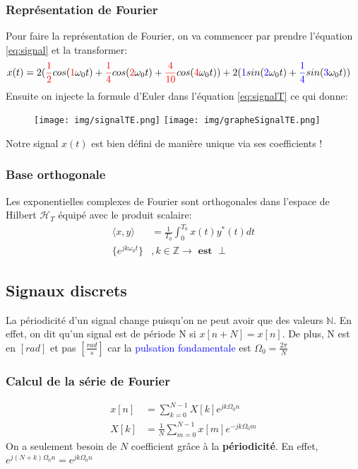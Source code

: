 \documentclass{report}
\begin{document}
\subsubsection{Représentation de Fourier} %
Pour faire la représentation de Fourier, on va commencer par prendre l'équation \ref{eq:signal} et la transformer:
\begin{align}
x(t) &= 2(\textcolor{red}{\frac{1}{2}}cos(\textcolor{red}{1}\omega_0t) + \textcolor{red}{\frac{1}{4}}cos(\textcolor{red}{2}\omega_0t) + \textcolor{red}{\frac{4}{10}}cos(\textcolor{red}{4}\omega_0t)) + 2(\textcolor{blue}{1}sin(\textcolor{blue}{2}\omega_0t)  + \textcolor{blue}{\frac{1}{4}}sin(\textcolor{blue}{3}\omega_0t)) \label{eq:signalT}
\end{align}
Ensuite on injecte la formule d'Euler dans l'équation \ref{eq:signalT} ce qui donne:
\begin{figure}[H]
\centering
\texttt{[image: img/signalTE.png]} %
\texttt{[image: img/grapheSignalTE.png]}
\end{figure}
Notre signal $x(t)$ est bien défini de manière unique via ses coefficients !


\subsubsection{Base orthogonale}
Les exponentielles complexes de Fourier sont orthogonales dans l'espace de Hilbert $\mathcal{H}_T$ équipé avec le produit scalaire:
\begin{align}
\langle x, y\rangle &= \frac{1}{T_0}\int_0^{T_0}x(t)y^{*}(t)dt\\
\{e^{jk\omega_0t}\}&, k \in \mathbb{Z} \rightarrow \textbf{ est }\perp
\end{align}

\subsection{Signaux discrets}
La périodicité d'un signal change puisqu'on ne peut avoir que des valeurs $\mathbb{N}$. En effet, on dit qu'un signal est de période N si $x[n + N] = x[n]$. De plus, N est en $[rad]$ et pas $[\frac{rad}{s}]$ car la \textcolor{blue}{pulsation fondamentale} est $\Omega_0 = \frac{2\pi}{N}$

\subsubsection{Calcul de la série de Fourier}
\begin{align}
x[n] &= \sum_{k=0}^{N-1} X[k] e^{jk\Omega_0n}\\
X[k] &= \frac{1}{N} \sum_{m=0}^{N-1} x[m] e^{-jk\Omega_0m}
\end{align}
On a seulement besoin de $N$ coefficient grâce à la \textbf{périodicité}. En effet, $e^{j(N+k)\Omega_0n} = e^{jk\Omega_0n}$
\end{document}
